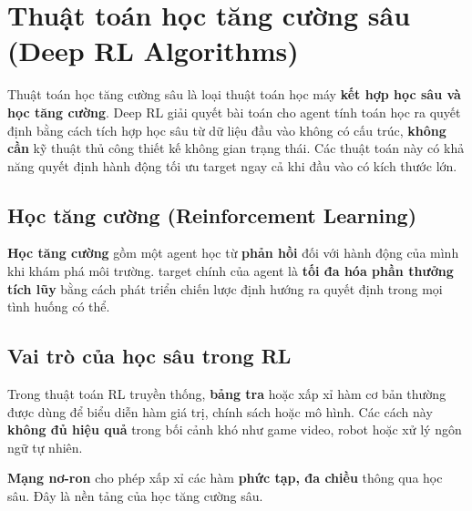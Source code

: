\section{Thuật toán học tăng cường sâu (Deep RL Algorithms)}
\label{sec:deep-rl-algorithms}

\begin{dinhnghia}[title={Thuật toán Deep RL}]
Thuật toán học tăng cường sâu là loại thuật toán học máy \textbf{kết hợp học sâu và học tăng cường}.
Deep RL giải quyết bài toán cho agent tính toán học ra quyết định bằng cách tích hợp học sâu từ dữ liệu đầu vào không có cấu trúc, \textbf{không cần} kỹ thuật thủ công thiết kế không gian trạng thái.
Các thuật toán này có khả năng quyết định hành động tối ưu target ngay cả khi đầu vào có kích thước lớn.
\end{dinhnghia}

\subsection{Học tăng cường (Reinforcement Learning)}

\begin{ynghia}[title={Vai trò của RL trong Deep RL}]
\textbf{Học tăng cường} gồm một agent học từ \textbf{phản hồi} đối với hành động của mình khi khám phá môi trường.
target chính của agent là \textbf{tối đa hóa phần thưởng tích lũy} bằng cách phát triển chiến lược định hướng ra quyết định trong mọi tình huống có thể.
\end{ynghia}

\subsection{Vai trò của học sâu trong RL}

\begin{luuy}[title={Hạn chế xấp xỉ truyền thống}]
Trong thuật toán RL truyền thống, \textbf{bảng tra} hoặc xấp xỉ hàm cơ bản thường được dùng để biểu diễn hàm giá trị, chính sách hoặc mô hình.
Các cách này \textbf{không đủ hiệu quả} trong bối cảnh khó như game video, robot hoặc xử lý ngôn ngữ tự nhiên.
\end{luuy}

\begin{phuongphap}[title={Nền tảng Deep RL}]
\textbf{Mạng nơ-ron} cho phép xấp xỉ các hàm \textbf{phức tạp, đa chiều} thông qua học sâu.
Đây là nền tảng của học tăng cường sâu.
\end{phuongphap}

